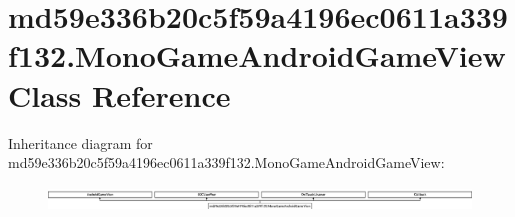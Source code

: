 \hypertarget{classmd59e336b20c5f59a4196ec0611a339f132_1_1MonoGameAndroidGameView}{}\section{md59e336b20c5f59a4196ec0611a339f132.\+Mono\+Game\+Android\+Game\+View Class Reference}
\label{classmd59e336b20c5f59a4196ec0611a339f132_1_1MonoGameAndroidGameView}
Inheritance diagram for md59e336b20c5f59a4196ec0611a339f132.\+Mono\+Game\+Android\+Game\+View\+:\begin{figure}[H]
\begin{center}
\leavevmode
\includegraphics[height=0.645161cm]{classmd59e336b20c5f59a4196ec0611a339f132_1_1MonoGameAndroidGameView}
\end{center}
\end{figure}
